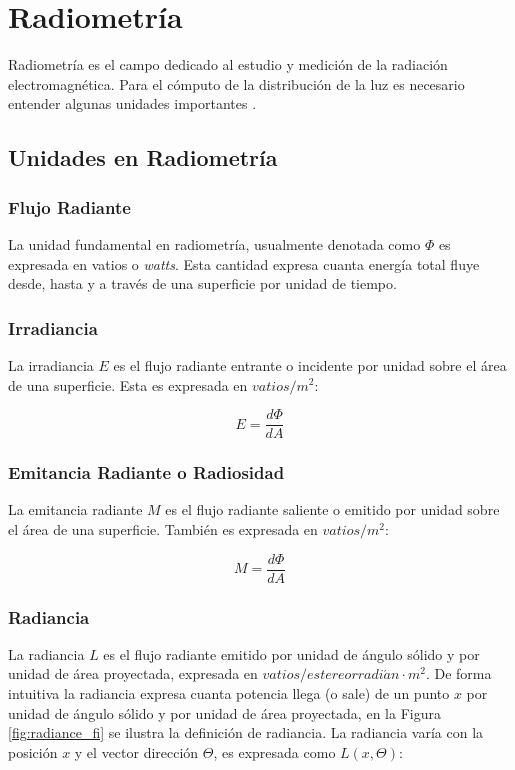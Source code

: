 \section{Radiometría}
Radiometría es el campo dedicado al estudio y medición de la radiación electromagnética. Para el cómputo de la distribución de la luz es necesario entender algunas unidades importantes \cite{advanced_gi2006}.

\subsection{Unidades en Radiometría}

\subsubsection{Flujo Radiante}
La unidad fundamental en radiometría, usualmente denotada como $\Phi$ es expresada en vatios o \emph{watts}. Esta cantidad expresa cuanta energía total fluye desde, hasta y a través de una superficie por unidad de tiempo.
\subsubsection{Irradiancia}
\label{subsubsec:irradiance}
La irradiancia $E$ es el flujo radiante entrante o incidente por unidad sobre el área de una superficie. Esta es expresada en $vatios/m^2$:

\begin{equation}
    E = \frac{d\Phi}{dA}
	\label{eq:irradiance_eq}
\end{equation}

\subsubsection{Emitancia Radiante o Radiosidad}
La emitancia radiante $M$ es el flujo radiante saliente o emitido por unidad sobre el área de una superficie. También es expresada en $vatios/m^2$:

\begin{equation}
    M = \frac{d\Phi}{dA}
	\label{eq:radiosity_eq}
\end{equation}

\subsubsection{Radiancia}
La radiancia $L$ es el flujo radiante emitido por unidad de ángulo sólido y por unidad de área proyectada, expresada en $vatios/estereorradi\acute{a}n\cdot m^2$. De forma intuitiva la radiancia expresa cuanta potencia llega (o sale) de un punto $x$ por unidad de ángulo sólido y por unidad de área proyectada, en la Figura \ref{fig:radiance_fi} se ilustra la definición de radiancia. La radiancia varía con la posición $x$ y el vector dirección $\Theta$, es expresada como $L(x,\Theta)$:

